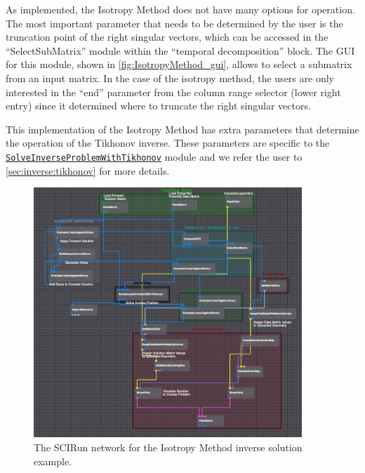     As implemented, the Isotropy Method does not have many options for operation. The most important parameter that needs to be determined by the user is the truncation point of the right singular vectors, which can be accessed in the ``SelectSubMatrix'' module within the ``temporal decomposition'' block. 
    The GUI for this module, shown in \autoref{fig:IsotropyMethod_gui}, allows to select a submatrix from an input matrix. In the case of the isotropy method, the users are only interested in the ``end'' parameter from the column range selector (lower right entry) since it determined where to truncate the right singular vectors.
    
    This implementation of the Isotropy Method has extra parameters that determine the operation of the Tikhonov inverse. These parameters are specific to the \href{http://scirundocwiki.sci.utah.edu/SCIRunDocs/index.php/CIBC:Documentation:SCIRun:Reference:BioPSE:SolveInverseProblemWithTikhonov}{{\tt SolveInverseProblemWithTikhonov}} module and we refer the user to \autoref{sec:inverse:tikhonov} for more details.
    
   \begin{figure}
       \begin{center}
       \includegraphics[width=0.9\textwidth]{ECGToolkitGuide_figures/IsotropyMethod_networkExample.png}
       \caption{The SCIRun network for the Isotropy Method inverse solution example.}
       \label{fig:IsotropyMethod}
       \end{center}
   \end{figure}
    
